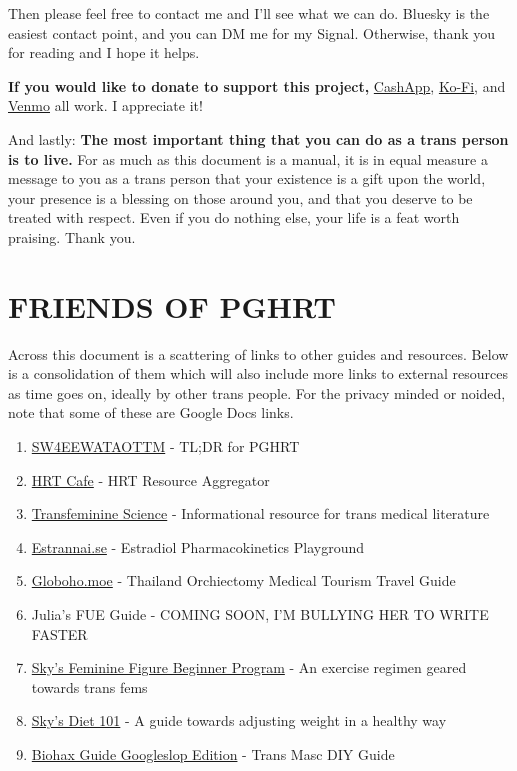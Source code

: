 \documentclass{article}
\begin{document}
Then please feel free to contact me and I’ll see what we can do. Bluesky is the easiest contact point, and you can DM me for my Signal. Otherwise, thank you for reading and I hope it helps.

\textbf{If you would like to donate to support this project,} \href{https://cash.app/Katitties}{CashApp}, \href{https://ko-fi.com/katitties}{Ko-Fi}, and \href{https://account.venmo.com/u/katitties}{Venmo} all work. I appreciate it!

And lastly: \textbf{The most important thing that you can do as a trans person is to live.} For as much as this document is a manual, it is in equal measure a message to you as a trans person that your existence is a gift upon the world, your presence is a blessing on those around you, and that you deserve to be treated with respect. Even if you do nothing else, your life is a feat worth praising. Thank you.



\section*{FRIENDS OF PGHRT}\label{FOPGHRT}

Across this document is a scattering of links to other guides and resources. Below is a consolidation of them which will also include more links to external resources as time goes on, ideally by other trans people. For the privacy minded or noided, note that some of these are Google Docs links.

\begin{enumerate}
  \item \href{https://startwith4mgestradiolenanthateweeklyandtestatonetothreemonths.com/}{SW4EEWATAOTTM} - TL;DR for PGHRT
  \item \href{https://hrtcafe.net/}{HRT Cafe} - HRT Resource Aggregator
  \item \href{https://transfemscience.org/}{Transfeminine Science} - Informational resource for trans medical literature
  \item \href{http://estrannai.se}{Estrannai.se} - Estradiol Pharmacokinetics Playground
  \item \href{https://globoho.moe/}{Globoho.moe} - Thailand Orchiectomy Medical Tourism Travel Guide 
  \item Julia's FUE Guide - COMING SOON, I'M BULLYING HER TO WRITE FASTER
  \item \href{https://docs.google.com/document/d/1-NyE5EY5TTaRRMhk7HlTbKJ7HifjEsA4jlDO1qKQVl0/edit?tab=t.0}{Sky's Feminine Figure Beginner Program} - An exercise regimen geared towards trans fems
  \item \href{https://docs.google.com/document/d/114sztSw1aVWM2pXLDl9NrHklyvewz3EmFiHiisjM71k/edit?tab=t.0}{Sky's Diet 101} - A guide towards adjusting weight in a healthy way
  \item \href{hhttps://docs.google.com/document/d/1DXFxzN0XTudPZez_SO61fpqncRLPH_Be_QG_8Pcz9LU/edit?pli=1&tab=t.0}{Biohax Guide Googleslop Edition} - Trans Masc DIY Guide
\end{enumerate}
\end{document}
